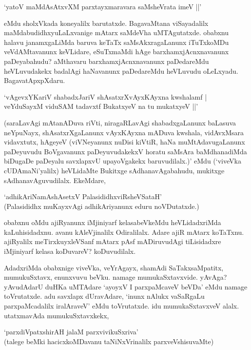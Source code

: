 \begin{shloka}
`yatoV maMdAsAtxvXM parxtayxmaravara saMsheVrata imeV ||'
\end{shloka}

eMdu sholxVkada koneyalilx barutatxde. BagavaMtana viSayadalilx maMdabudidhxyuLaLxvanige mAtarx saMdeVha uMTAgutatxde. obabxnu halavu janamxgaLiMda baruva keTaTx saMsAkxragaLanunx iTuTxkoMDu veVdAMtavanunx keVLidare, eSuTxmaMdi hAge barxhamxjAcnxnavanunx paDeyabahudu? aMthavaru barxhamxjAcnxnavanunx paDedareMdu heVLuvudakekx badalAgi haNavanunx paDedareMdu heVLuvudu oLeLxyadu. BagavatApxpXdaru.

\begin{shloka}
`vAgevxYKariV shabadxJariV shAsatxrXvAyxKAyxna kwshalamf |\\
veYduSayxM viduSAM tadavxtf BukatxyeV na tu mukatxyeV ||'
\end{shloka}

(saraLavAgi mAtanADuva riVti, niragaRLavAgi shabadxgaLanunx baLasuva neYpuNayx, shAsatxrXgaLanunx vAyxKAyxna mADuva kwshala, vidAvxMsara vidavxtutx, hAgeyeV (viVNeyanunx nuDisi kiVtiR, haNa muMtAdavugaLanunx paDeyuvudu BoVgavanunx paDeyuvudakekxV horatu saMsAra baMdhanadiMda biDugaDe paDeyalu savxlapxvU upayoVgakekx baruvudilalx.)' eMdu (`viveVka cUDAmaNi'yalilx) heVLidaMte Bukitxge sAdhanavAgabahudu, mukitxge sAdhanavAguvudilalx. EkeMdare,

\begin{shloka}
`adhikAriNamAshAsetxV PalasididhxviRsheVSataH'\\
(Palasididhx muKayxvAgi adhikAriyanunx eduru noVDutatxde.)
\end{shloka}

obabxnu oMdu ajiRyanunx iMjiniyarf kelasabeVkeMdu heVLidadxriMda kaLuhisidadxnu. avanu kAleVjinalilx Odiralilalx. Adare ajiR mAtarx koTaTxnu. ajiRyalilx meTirxkuyxleVSanf mAtarx pAsf mADiruvudAgi tiLisidadxre iMjiniyarf kelasa koDuvareV? koDuvudilalx.

AdadxriMda obabxnige viveVka, veYrAgayx, shamAdi SaTakxsaMpatitx, mumukuSxtavx, enunxvuvu beVku. namage mumukaSxtavxvide. yAvAga? yAvudAdarU duHKa uMTAdare `ayoyxV I parxpaMcaveV beVDa' eMdu namage toVrutatxde. adu savxlapx dUravAdare, `inunx nAlukx vaSaRgaLu parxpaMcadalilx iralAraveV' eMdu toVrutatxde. idu mumukaSxtavxveV alalx. utatxmavAda mumukuSxtavxkekx,

\begin{shloka}
`parxdiVpatxshirAH jalaM parxvivikuSxriva'\\
(talege beMki hacicxkoMDavanu taNiNxVrinalilx parxveVshisuvaMte)
\end{shloka}

